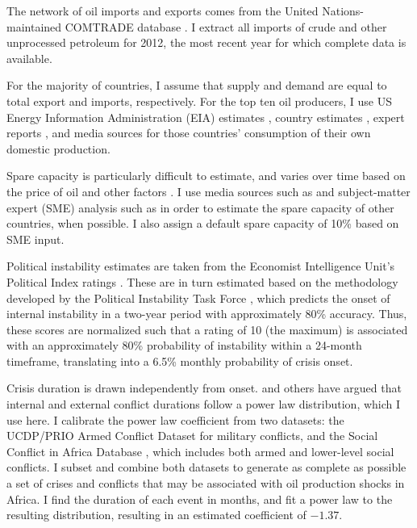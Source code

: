 \documentclass{llncs}
\begin{document}
The network of oil imports and exports comes from the United Nations-maintained COMTRADE database \cite{un_2013}. I extract all imports of crude and other unprocessed petroleum for 2012, the most recent year for which complete data is available.

For the majority of countries, I assume that supply and demand are equal to total export and imports, respectively. For the top ten oil producers, I use US Energy Information Administration (EIA) estimates \cite{eia_2013}, country estimates \cite{canada_2009,eia_domestic}, expert reports \cite{mohamedi_2010}, and media sources \cite{rasmi_2013} for those countries' consumption of their own domestic production. 

Spare capacity is particularly difficult to estimate, and varies over time based on the price of oil and other factors \cite{mearns_2012}. I use media sources such as \cite{daya_2012} and subject-matter expert (SME) analysis such as \cite{mearns_2012} in order to estimate the spare capacity of other countries, when possible. I also assign a default spare capacity of 10\% based on SME input.

Political instability estimates are taken from the Economist Intelligence Unit's Political Index ratings \cite{eiu_2013}. These are in turn estimated based on the methodology developed by the Political Instability Task Force \cite{goldstone_2005}, which predicts the onset of internal instability in a two-year period with approximately 80\% accuracy. Thus, these scores are normalized such that a rating of 10 (the maximum) is associated with an approximately 80\% probability of instability within a 24-month timeframe, translating into a 6.5\% monthly probability of crisis onset.

Crisis duration is drawn independently from onset. \cite{cioffi_2004} and others have argued that internal and external conflict durations follow a power law distribution, which I use here. I calibrate the power law coefficient from two datasets: the UCDP/PRIO Armed Conflict Dataset \cite{lotta_2013} for military conflicts, and the Social Conflict in Africa Database \cite{hendrix_2013}, which includes both armed and lower-level social conflicts. I subset and combine both datasets to generate as complete as possible a set of crises and conflicts that may be associated with oil production shocks in Africa. I find the duration of each event in months, and fit a power law to the resulting distribution, resulting in an estimated coefficient of $\mathbf{-1.37}$.
\end{document}
